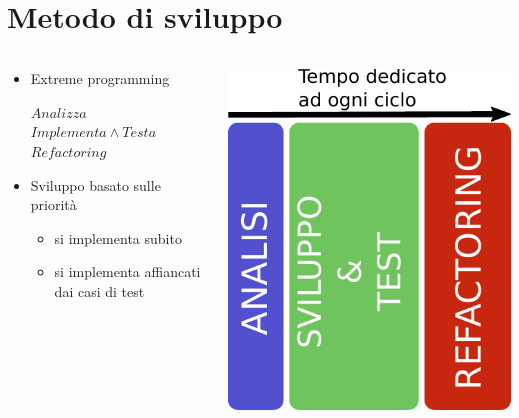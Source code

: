 \documentclass{beamer}
\begin{document}
\section{Metodo di sviluppo}
\begin{frame}{\secname}
	\begin{columns}
		\begin{column}{0.6\textwidth}
			\begin{itemize}
				\item Extreme programming
					\begin{algorithmic}
					\Repeat
						\State $Analizza$
						\State $Implementa \land Testa $
						\State $Refactoring$
				
					\end{algorithmic}
				\item Sviluppo basato sulle priorità
					\begin{itemize}
						\item si implementa subito
						\item si implementa affiancati dai casi di test
					\end{itemize}
			\end{itemize}
		\end{column}
		\begin{column}{0.4\textwidth}
			\includegraphics[scale=0.55]{timebox}
		\end{column}
	\end{columns}
\end{frame}
\end{document}

